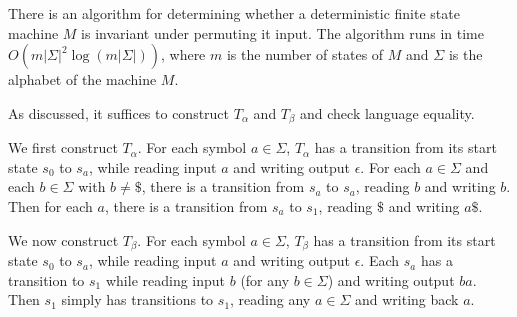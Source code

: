 \documentclass{llncs}
\begin{document}
    \begin{theorem}
      There is an algorithm for determining whether a deterministic finite state
      machine $M$ is invariant under permuting it input.
      The algorithm runs in time $O(m|\Sigma|^2\log(m|\Sigma|))$,
      where $m$ is the number of states of $M$
      and $\Sigma$ is the alphabet of the machine $M$.
    \end{theorem}

    As discussed, it suffices to construct $T_\alpha$ and $T_\beta$
    and check language equality.

    We first construct $T_\alpha$.
    For each symbol $a \in \Sigma$,
    $T_\alpha$ has a transition from its start
    state $s_0$ to $s_a$, while reading input $a$ and
    writing output $\epsilon$.
    For each $a\in \Sigma$ and each $b\in\Sigma$ with $b\ne \$$, there is a
    transition from $s_a$ to $s_a$, reading $b$
    and writing $b$.
    Then for each $a$, there is a transition from
    $s_a$ to $s_1$, reading $\$$ and writing $a\$$.

    We now construct $T_\beta$.
    For each symbol $a \in \Sigma$,
    $T_\beta$ has a transition from its start
    state $s_0$ to $s_a$, while reading input $a$ and
    writing output $\epsilon$.
    Each $s_a$ has a transition to $s_1$ while
    reading input $b$ (for any $b\in \Sigma$)
    and writing output $ba$.
    Then $s_1$ simply has transitions to $s_1$,
    reading any $a\in \Sigma$ and writing
    back $a$.
\end{document}
